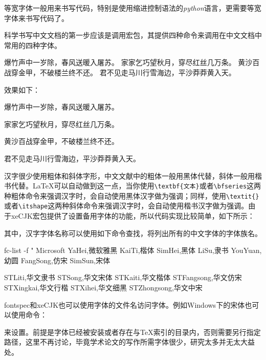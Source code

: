 {等宽字体一般用来书写代码，特别是使用缩进控制语法的\emph{python}语言，更需要等宽字体来书写代码了。

科学书写中文文档的第一步应该是调用\CTeX 宏包，其提供四种命令来调用在中文文档中常用的四种字体。

\begin{latex}
{\songti 爆竹声中一岁除，春风送暖入屠苏。}
{\fangsong 家家乞巧望秋月，穿尽红丝几万条。}
{\heiti 黄沙百战穿金甲，不破楼兰终不还。}
{\kaishu 君不见走马川行雪海边，平沙莽莽黄入天。}
\end{latex}

效果如下：

\begin{center}
    {\songti 爆竹声中一岁除，春风送暖入屠苏。}\par
    {\fangsong 家家乞巧望秋月，穿尽红丝几万条。}\par
    {\heiti 黄沙百战穿金甲，不破楼兰终不还。}\par
    {\kaishu 君不见走马川行雪海边，平沙莽莽黄入天。}
\end{center}

汉字很少使用粗体和斜体字形，中文文献中的粗体一般用黑体代替，斜体一般用楷书代替。\LaTeX 可以自动做到这一点，当你使用\lstinline|\textbf{文本}|或者\lstinline|\bfseries|这两种粗体命令来强调汉字时，会自动使用黑体汉字做为强调；同样，使用\lstinline|\textit{}|或者\lstinline|\itshape|这两种斜体命令来强调汉字时，会自动使用楷书汉字做为强调。由于xeCJK宏包提供了设置备用字体的功能，所以代码实现比较简单，如下所示：

\begin{latex}
\end{latex}

其中，汉字字体名称可以使用如下命令查找，将列出所有的中文字体的字体族名。

\begin{latex}
fc-list -f "%
Microsoft YaHei,微软雅黑
KaiTi,楷体
SimHei,黑体
LiSu,隶书
YouYuan,幼圆
FangSong,仿宋
SimSun,宋体

STLiti,华文隶书
STSong,华文宋体
STKaiti,华文楷体
STFangsong,华文仿宋
STXingkai,华文行楷
STXihei,华文细黑
STZhongsong,华文中宋
\end{latex}

fontspec和xeCJK也可以使用字体的文件名访问字体。例如Windows下的宋体也可以使用命令：
\begin{latex}
\end{latex}
来设置。前提是字体已经被安装或者存在与\TeX 索引的目录内，否则需要另行指定路径，这里不再讨论，毕竟学术论文的写作所需字体很少，研究太多并无太大益处。

}
